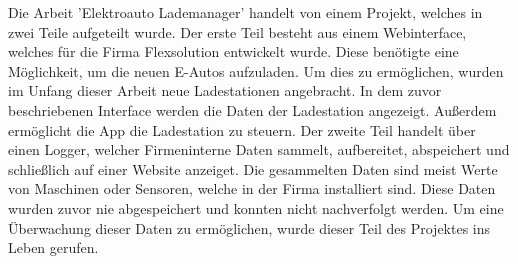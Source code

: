 Die Arbeit 'Elektroauto Lademanager' handelt von einem Projekt, welches in zwei Teile aufgeteilt wurde.
Der erste Teil besteht aus einem Webinterface, welches für die Firma Flexsolution entwickelt wurde. Diese benötigte eine Möglichkeit, um die neuen E-Autos aufzuladen. Um dies zu ermöglichen, wurden im Unfang dieser Arbeit neue Ladestationen angebracht. In dem zuvor beschriebenen Interface werden die Daten der Ladestation angezeigt. Außerdem ermöglicht die App die Ladestation zu steuern.
Der zweite Teil handelt über einen Logger, welcher Firmeninterne Daten sammelt, aufbereitet, abspeichert und schließlich auf einer Website anzeiget. Die gesammelten Daten sind meist Werte von Maschinen oder Sensoren, welche in der Firma installiert sind. Diese Daten wurden zuvor nie abgespeichert und konnten nicht nachverfolgt werden. Um eine Überwachung dieser Daten zu ermöglichen, wurde dieser Teil des Projektes ins Leben gerufen.
